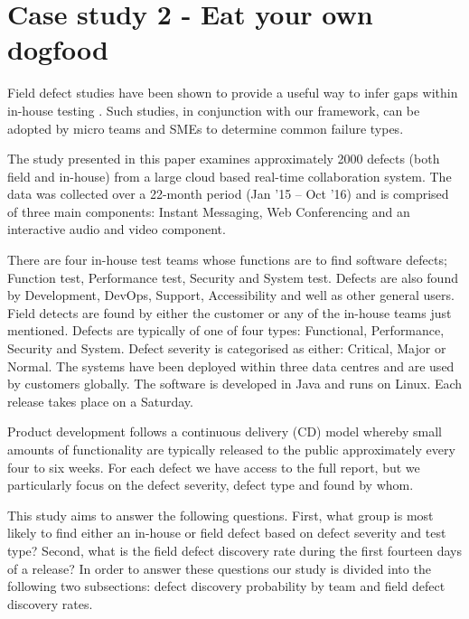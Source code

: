 \section{Case study 2 - Eat your own dogfood}

Field defect studies have been shown to provide a useful way to infer gaps within in-house testing \cite{sullivan1991software}\cite{boehm2005software}. Such studies, in conjunction with our framework, can be adopted by micro teams and SMEs to determine common failure types. \par 

The study presented in this paper examines approximately 2000 defects (both field and in-house) from a large cloud based real-time collaboration system. The data was collected over a 22-month period (Jan '15 -- Oct '16) and is comprised of three main components: Instant Messaging, Web Conferencing and an interactive audio and video component. \par

There are four in-house test teams whose functions are to find software defects; Function test, Performance test, Security and System test. Defects are also found by Development, DevOps, Support, Accessibility and well as other general users. Field detects are found by either the customer or any of the in-house teams just mentioned. Defects are typically of one of four types: Functional, Performance, Security and System. Defect severity is categorised as either: Critical, Major or Normal. The systems have been deployed within three data centres and are used by customers globally. The software is developed in Java and runs on Linux. Each release takes place on a Saturday.  \par 

Product development follows a continuous delivery (CD) model whereby small amounts of functionality are typically released to the public approximately every four to six weeks. For each defect we have access to the full report, but we particularly focus on the defect severity, defect type and found by whom. \par

This study aims to answer the following questions. First, what group is most likely to find either an in-house or field defect based on defect severity and test type? Second, what is the field defect discovery rate during the first fourteen days of a release? In order to answer these questions our study is divided into the following two subsections: defect discovery probability by team and field defect discovery rates. \par

